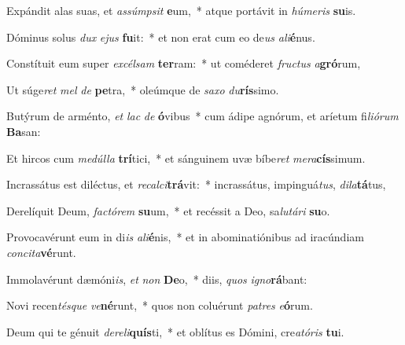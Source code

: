 \item Expándit alas suas, et \textit{as}\textit{súmp}\textit{sit} \textbf{e}um,~* atque portávit in \textit{hú}\textit{me}\textit{ris} \textbf{su}is.
\item Dóminus solus \textit{dux} \textit{e}\textit{jus} \textbf{fu}it:~* et non erat cum eo de\textit{us} \textit{a}\textit{li}\textbf{é}nus.
\item Constítuit eum super \textit{ex}\textit{cél}\textit{sam} \textbf{ter}ram:~* ut coméderet \textit{fruc}\textit{tus} \textit{a}\textbf{gró}rum,
\item Ut súge\textit{ret} \textit{mel} \textit{de} \textbf{pe}tra,~* oleúmque de \textit{sa}\textit{xo} \textit{du}\textbf{rís}simo.
\item Butýrum de arménto, \textit{et} \textit{lac} \textit{de} \textbf{ó}vibus~* cum ádipe agnórum, et aríetum fi\textit{li}\textit{ó}\textit{rum} \textbf{Ba}san:
\item Et hircos cum \textit{me}\textit{dúl}\textit{la} \textbf{trí}tici,~* et sánguinem uvæ bíbe\textit{ret} \textit{me}\textit{ra}\textbf{cís}simum.
\item Incrassátus est diléctus, et \textit{re}\textit{cal}\textit{ci}\textbf{trá}vit:~* incrassátus, impinguá\textit{tus}, \textit{di}\textit{la}\textbf{tá}tus,
\item Derelíquit Deum, \textit{fac}\textit{tó}\textit{rem} \textbf{su}um,~* et recéssit a Deo, sa\textit{lu}\textit{tá}\textit{ri} \textbf{su}o.
\item Provocavérunt eum in di\textit{is} \textit{a}\textit{li}\textbf{é}nis,~* et in abominatiónibus ad iracúndiam \textit{con}\textit{ci}\textit{ta}\textbf{vé}runt.
\item Immolavérunt dæmóni\textit{is}, \textit{et} \textit{non} \textbf{De}o,~* diis, \textit{quos} \textit{i}\textit{gno}\textbf{rá}bant:
\item Novi recen\textit{tés}\textit{que} \textit{ve}\textbf{né}runt,~* quos non coluérunt \textit{pa}\textit{tres} \textit{e}\textbf{ó}rum.
\item Deum qui te génuit \textit{de}\textit{re}\textit{li}\textbf{quís}ti,~* et oblítus es Dómini, cre\textit{a}\textit{tó}\textit{ris} \textbf{tu}i.
